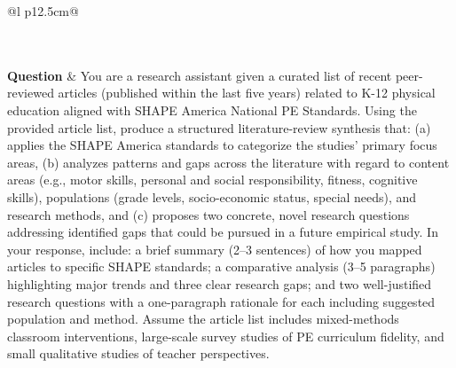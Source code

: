 \begin{longtable}{@{}l p{12.5cm}@{}}
  \caption{Skills per-instance answer comparison ($25\% \leq \Delta < 50\%$) for the 7 most divergent items: same question, each model's answer and reasoning.}\label{tab:cmp_skills_pos25} \\
  \toprule
  \endfirsthead
  \toprule
  \endhead
   \\
  \textbf{Question} & You are a research assistant given a curated list of recent peer-reviewed articles (published within the last five years) related to K-12 physical education aligned with SHAPE America National PE Standards. Using the provided article list, produce a structured literature-review synthesis that: (a) applies the SHAPE America standards to categorize the studies' primary focus areas, (b) analyzes patterns and gaps across the literature with regard to content areas (e.g., motor skills, personal and social responsibility, fitness, cognitive skills), populations (grade levels, socio-economic status, special needs), and research methods, and (c) proposes two concrete, novel research questions addressing identified gaps that could be pursued in a future empirical study. In your response, include: a brief summary (2--3 sentences) of how you mapped articles to specific SHAPE standards; a comparative analysis (3--5 paragraphs) highlighting major trends and three clear research gaps; and two well-justified research questions with a one-paragraph rationale for each including suggested population and method. Assume the article list includes mixed-methods classroom interventions, large-scale survey studies of PE curriculum fidelity, and small qualitative studies of teacher perspectives. \\

\end{longtable}
